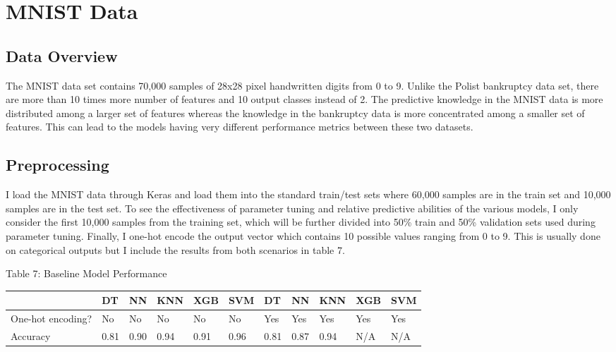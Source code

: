 \documentclass{article}
\begin{document}
\section{MNIST Data}
\subsection{Data Overview}
The MNIST data set contains 70,000 samples of 28x28 pixel handwritten digits from 0 to 9. Unlike the Polist bankruptcy data set, there are more than 10 times more number of features and 10 output classes instead of 2. The predictive knowledge in the MNIST data is more distributed among a larger set of features whereas the knowledge in the bankruptcy data is more concentrated among a smaller set of features. This can lead to the models having very different performance metrics between these two datasets. 

\subsection{Preprocessing}
I load the MNIST data through Keras and load them into the standard train/test sets where 60,000 samples are in the train set and 10,000 samples are in the test set. To see the effectiveness of parameter tuning and relative predictive abilities of the various models, I only consider the first 10,000 samples from the training set, which will be further divided into 50\% train and 50\% validation sets used during parameter tuning. Finally, I one-hot encode the output vector which contains 10 possible values ranging from 0 to 9. This is usually done on categorical outputs but I include the results from both scenarios in table 7. 

\begin{table}
	\centering
	Table 7: Baseline Model Performance
	\begin{tabular}{ l l l l l l | l l l l l }
		\hline
		&DT  & NN & KNN& XGB & SVM & DT & NN & KNN & XGB & SVM \\
		\hline
		One-hot encoding?&No  &No  &No  & No &No &Yes &Yes &Yes &Yes &Yes \\
		Accuracy      &0.81&0.90&0.94&0.91&0.96&0.81&0.87&0.94& N/A & N/A \\
		\hline 
		
	\end{tabular}
\end{table}
\end{document}
